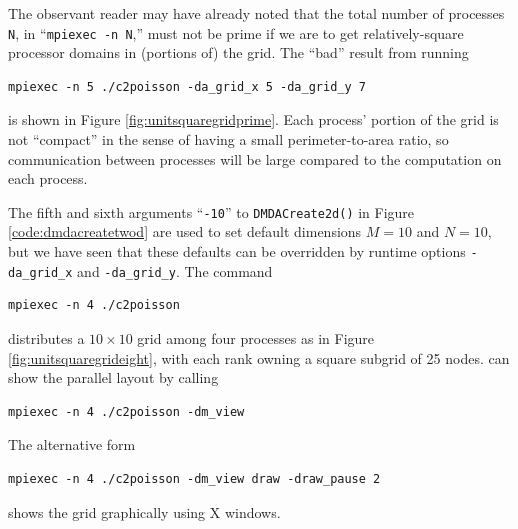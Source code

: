 The observant reader may have already noted that the total number of processes \texttt{N}, in ``\texttt{mpiexec -n N},'' must not be prime if we are to get relatively-square processor domains in (portions of) the grid.  The ``bad'' result from running
\begin{Verbatim}[fontsize=\small]
  mpiexec -n 5 ./c2poisson -da_grid_x 5 -da_grid_y 7
\end{Verbatim}
is shown in Figure \ref{fig:unitsquaregridprime}.  Each process' portion of the grid is not ``compact'' in the sense of having a small perimeter-to-area ratio, so communication between processes will be large compared to the computation on each process.

The fifth and sixth arguments ``\texttt{-10}'' to \texttt{DMDACreate2d()} in Figure \ref{code:dmdacreatetwod} are used to set default dimensions $M=10$ and $N=10$, but we have seen that these defaults can be overridden by runtime options \texttt{-da\_grid\_x} and \texttt{-da\_grid\_y}.  The command
 \begin{Verbatim}[fontsize=\small]
  mpiexec -n 4 ./c2poisson
\end{Verbatim}
distributes a $10\times 10$ grid among four processes as in Figure \ref{fig:unitsquaregrideight}, with each rank owning a square subgrid of 25 nodes.  \PETSc can show the parallel layout by calling
\begin{Verbatim}[fontsize=\small]
  mpiexec -n 4 ./c2poisson -dm_view
\end{Verbatim}
The alternative form
\begin{Verbatim}[fontsize=\small]
  mpiexec -n 4 ./c2poisson -dm_view draw -draw_pause 2
\end{Verbatim}
shows the grid graphically using X windows.

